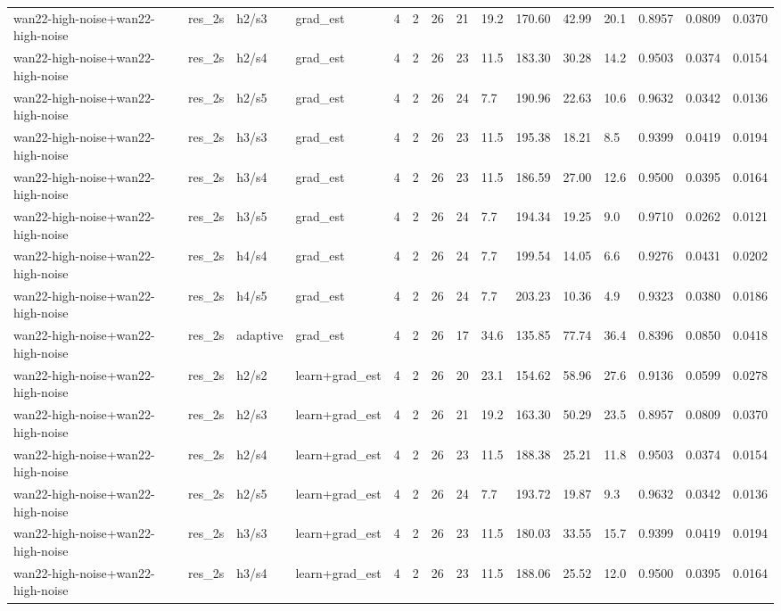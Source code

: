 \begin{tabular}{llllllrrlllllll}
wan22-high-noise+wan22-high-noise & res_2s & h2/s3 & grad_est & 4 & 2 & 26 & 21 & 19.2 & 170.60 & 42.99 & 20.1 & 0.8957 & 0.0809 & 0.0370 \\
wan22-high-noise+wan22-high-noise & res_2s & h2/s4 & grad_est & 4 & 2 & 26 & 23 & 11.5 & 183.30 & 30.28 & 14.2 & 0.9503 & 0.0374 & 0.0154 \\
wan22-high-noise+wan22-high-noise & res_2s & h2/s5 & grad_est & 4 & 2 & 26 & 24 & 7.7 & 190.96 & 22.63 & 10.6 & 0.9632 & 0.0342 & 0.0136 \\
wan22-high-noise+wan22-high-noise & res_2s & h3/s3 & grad_est & 4 & 2 & 26 & 23 & 11.5 & 195.38 & 18.21 & 8.5 & 0.9399 & 0.0419 & 0.0194 \\
wan22-high-noise+wan22-high-noise & res_2s & h3/s4 & grad_est & 4 & 2 & 26 & 23 & 11.5 & 186.59 & 27.00 & 12.6 & 0.9500 & 0.0395 & 0.0164 \\
wan22-high-noise+wan22-high-noise & res_2s & h3/s5 & grad_est & 4 & 2 & 26 & 24 & 7.7 & 194.34 & 19.25 & 9.0 & 0.9710 & 0.0262 & 0.0121 \\
wan22-high-noise+wan22-high-noise & res_2s & h4/s4 & grad_est & 4 & 2 & 26 & 24 & 7.7 & 199.54 & 14.05 & 6.6 & 0.9276 & 0.0431 & 0.0202 \\
wan22-high-noise+wan22-high-noise & res_2s & h4/s5 & grad_est & 4 & 2 & 26 & 24 & 7.7 & 203.23 & 10.36 & 4.9 & 0.9323 & 0.0380 & 0.0186 \\
wan22-high-noise+wan22-high-noise & res_2s & adaptive & grad_est & 4 & 2 & 26 & 17 & 34.6 & 135.85 & 77.74 & 36.4 & 0.8396 & 0.0850 & 0.0418 \\
wan22-high-noise+wan22-high-noise & res_2s & h2/s2 & learn+grad_est & 4 & 2 & 26 & 20 & 23.1 & 154.62 & 58.96 & 27.6 & 0.9136 & 0.0599 & 0.0278 \\
wan22-high-noise+wan22-high-noise & res_2s & h2/s3 & learn+grad_est & 4 & 2 & 26 & 21 & 19.2 & 163.30 & 50.29 & 23.5 & 0.8957 & 0.0809 & 0.0370 \\
wan22-high-noise+wan22-high-noise & res_2s & h2/s4 & learn+grad_est & 4 & 2 & 26 & 23 & 11.5 & 188.38 & 25.21 & 11.8 & 0.9503 & 0.0374 & 0.0154 \\
wan22-high-noise+wan22-high-noise & res_2s & h2/s5 & learn+grad_est & 4 & 2 & 26 & 24 & 7.7 & 193.72 & 19.87 & 9.3 & 0.9632 & 0.0342 & 0.0136 \\
wan22-high-noise+wan22-high-noise & res_2s & h3/s3 & learn+grad_est & 4 & 2 & 26 & 23 & 11.5 & 180.03 & 33.55 & 15.7 & 0.9399 & 0.0419 & 0.0194 \\
wan22-high-noise+wan22-high-noise & res_2s & h3/s4 & learn+grad_est & 4 & 2 & 26 & 23 & 11.5 & 188.06 & 25.52 & 12.0 & 0.9500 & 0.0395 & 0.0164 \\

\end{tabular}
